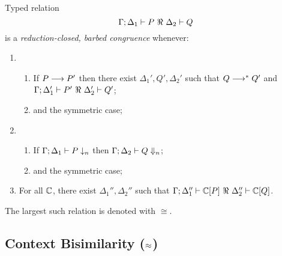 \begin{definition}
\label{def:rc}
	Typed relation
	\[
		\horel{\Gamma}{\Delta_1}{P}{\ \Re\ }{\Delta_2}{Q}
	\]
	is a {\em reduction-closed, barbed congruence} whenever:
%
	\begin{enumerate}[1)]
		\item
				\begin{enumerate}
					\item	If $P \longrightarrow P'$ then there exist $\Delta_1', Q', \Delta_2'$ such that $Q \longrightarrow^* Q'$ and\\
							$\horel{\Gamma}{\Delta_1'}{P'}{\ \Re\ }{\Delta_2'}{Q'}$;
					\item	and the symmetric case;
				\end{enumerate}
		\item
				\begin{enumerate}
					\item	If $\Gamma;\Delta_1 \vdash P \downarrow_{n}$ then $\Gamma;\Delta_2 \vdash Q \Downarrow_{n}$;
					\item	and the symmetric case;
				\end{enumerate}

		\item	For all ${\mathbb{C}}$, there exist $\Delta_1'',\Delta_2''$ such that
				$\horel{\Gamma}{\Delta_1''}{\context{\C}{P}}{\ \Re\ }{\Delta_2''}{\context{\C}{Q}}$.
	\end{enumerate}
	The largest such relation is denoted with $\cong$.
\end{definition}

\subsection{Context Bisimilarity ($\approx$)}
\label{subsec:bisimulation}

